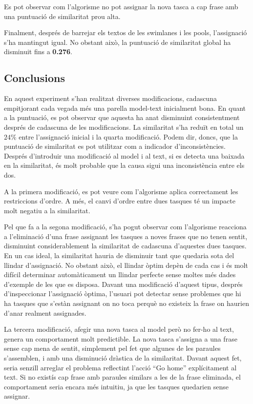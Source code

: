 Es pot observar com l'algorisme no pot assignar la  nova tasca a cap frase amb una puntuació de similaritat prou alta.

Finalment, després de barrejar els textos de les swimlanes i les pools, l'assignació s'ha mantingut igual. No obstant això, la puntuació de similaritat global ha disminuit fins a \textbf{0.276}.

\subsection{Conclusions}

En aquest experiment s'han realitzat diverses modificacions, cadascuna empitjorant cada vegada més una parella model-text inicialment bona. En quant a la puntuació, es pot observar que aquesta ha anat disminuint consistentment després de cadascuna de les modificacions. La similaritat s'ha reduït en total un $24\%$ entre l'assignació inicial i la quarta modificació. Podem dir, doncs, que la puntuació de similaritat es pot utilitzar com a indicador d'inconsistències. Després d'introduir una modificació al model i al text, si es detecta una baixada en la similaritat, és molt probable que la causa sigui una inconsistència entre els dos.

A la primera modificació, es pot veure com l'algorisme aplica correctament les restriccions d'ordre. A més, el canvi d'ordre entre dues tasques té un impacte molt negatiu a la similaritat. 

Pel que fa a la segona modificació, s'ha pogut observar com l'algorisme reacciona a l'eliminació d'una frase assignant les tasques a noves frases que no tenen sentit, disminuint considerablement la similaritat de cadascuna d'aquestes dues tasques. En un cas ideal, la similaritat hauria de disminuir tant que quedaria sota del llindar d'assignació. No obstant això, el llindar òptim depèn de cada cas i és molt difícil determinar automàticament un llindar perfecte sense moltes més dades d'exemple de les que es disposa. Davant una modificació d'aquest tipus, després d'inspeccionar l'assignació òptima, l'usuari pot detectar sense problemes que hi ha tasques que s'estàn assignant on no toca perquè no existeix la frase on haurien d'anar realment assignades. 

La tercera modificació, afegir una nova tasca al model però no fer-ho al text, genera un comportament molt predictible. La nova tasca s'assigna a una frase sense cap mena de sentit, simplement pel fet que algunes de les paraules s'assemblen, i amb una disminució dràstica de la similaritat. Davant aquest fet, seria senzill arreglar el problema reflectint l'acció ``Go home'' explícitament al text. Si no existís cap frase amb paraules similars a les de la frase eliminada, el comportament seria encara més intuitiu, ja que les tasques quedarien sense assignar.

